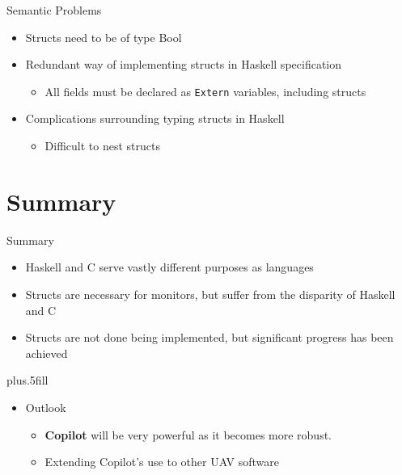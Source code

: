 \documentclass[xcolor={dvipsnames}]{beamer}
\begin{document}
\begin{frame}{Semantic Problems}
  \begin{itemize}
  \item
    Structs need to be of \alert{type Bool}
  \item
    Redundant way of implementing structs in Haskell specification
    \begin{itemize}
    \item
      All fields must be declared as \texttt{Extern} variables, including structs
    \end{itemize}
  \item
    Complications surrounding \alert{typing structs} in Haskell
    \begin{itemize}
    \item
      Difficult to \alert{nest} structs
    \end{itemize}
  \end{itemize}
\end{frame}

\section*{Summary}

\begin{frame}{Summary}

  \begin{itemize}
  \item
    Haskell and C serve vastly \alert{different purposes} as languages
  \item
    Structs are necessary for monitors, but suffer from the disparity of Haskell and C
  \item
    Structs are not done being implemented, but \alert{significant progress} has been achieved
  \end{itemize}
  
  \vskip0pt plus.5fill
  \begin{itemize}
  \item
    Outlook
    \begin{itemize}
    \item
      \textbf{Copilot} will be very powerful as it becomes more robust.
    \item
      Extending Copilot's use to other UAV software
    \end{itemize}
  \end{itemize}
\end{frame}
\end{document}
